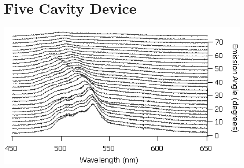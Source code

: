 \documentclass{report}
\begin{document}
    \section*{Five Cavity Device}
    \begin{center}
    \includegraphics[width=0.95\textwidth]{images/n5_waterfall.png}
    \end{center}
\end{document}
